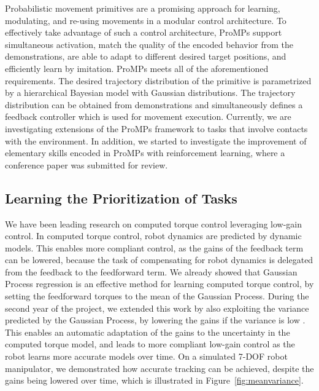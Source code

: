 \documentclass[final,5p,twocolumn]{elsarticle}
\begin{document}
Probabilistic movement primitives are a promising approach for learning,
modulating, and re-using movements in a modular control architecture.  To
effectively take advantage of such a control architecture, ProMPs support
simultaneous activation, match the quality of the encoded behavior from the
demonstrations, are able to adapt to different desired target positions, and
efficiently learn by imitation. ProMPs meets all of the aforementioned
requirements.  The desired trajectory distribution of the
primitive is parametrized by a hierarchical Bayesian model with Gaussian distributions. The
trajectory distribution can be obtained from demonstrations and 
simultaneously defines a feedback controller which is used for movement
execution. Currently, we are investigating extensions of the ProMPs framework 
to tasks that involve 
contacts with the environment. In addition, we started to investigate the improvement of elementary skills encoded in ProMPs with 
reinforcement learning, where a conference paper was submitted for review.

\subsection{Learning the Prioritization of Tasks}

We have been leading research on computed torque control leveraging low-gain control. 
In computed torque control, robot dynamics are predicted by dynamic models.
This enables more compliant control, as the gains of the feedback term can be
lowered, because the task of compensating for robot dynamics is delegated from
the feedback to the feedforward term.  We already showed that Gaussian Process
regression is an effective method for learning computed torque control, by
setting the feedforward torques to the mean of the Gaussian Process.  During
the second year of the project, we extended this work by also exploiting the
variance predicted by the Gaussian Process, by lowering the gains if the
variance is low \cite{Albertoetal14}.  This enables an automatic adaptation of
the gains to the uncertainty in the computed torque model, and leads to more
compliant low-gain control as the robot learns more accurate models over time.
On a simulated 7-DOF robot manipulator, we demonstrated how accurate tracking
can be achieved, despite the gains being lowered over time, which is illustrated in Figure~\ref{fig:meanvariance}.\\
\end{document}
